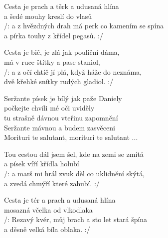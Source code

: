 
\ve
Cesta je prach a těrk a udusaná hlína\\
a šedé mouhy kreslí do vlasů\\
/: a z hvězdných drah má perk co kamením se spína\\
a pírka touhy z křídel pegasů. :/

\qquad {}\quad {}\qquad {}\quad {}\qquad {}\quad {}\qquad {}\quad 

\ve
Cesta je bič, je zlá jak pouliční dáma,\\
má v ruce štítky a pase staniol,\\
/: a z očí chtíč jí plá, když háže do neznáma,\\
dvě křehké snítky rudých gladiol. :/

\cho
{}Seržante písek je bílý jak paže Daniely\\
počkejte chvíli mé oči uviděly\\
tu strašně dávnou vteřinu zapomnění\\
Seržante mávnou a budem zasvěceni\\
Morituri te salutant, morituri te salutant ...


\ve
Tou cestou dál jsem šel, kde na zemi se zmítá\\
a písek víří křídla holubí\\
/: a marš mi hrál zvuk děl co uklidnění skýtá,\\
a zvedá chmýří které zahubí. :/

\ve
Cesta je tér a prach a udusaná hlína\\
mosazná včelka od vlkodlaka\\
/: Rezavý kvér, můj brach a sto let stará špína\\
a děsně velká bíla oblaka. :/

\cho

\esong{}